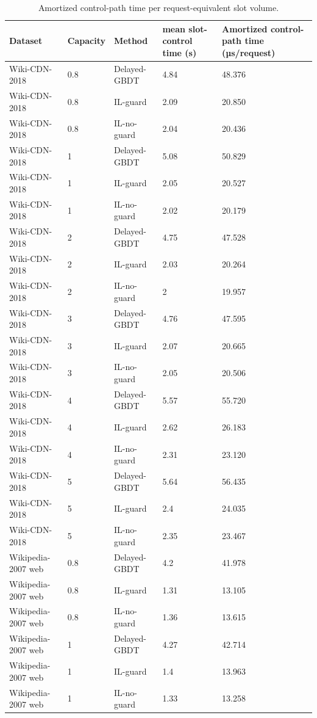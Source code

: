 \begin{table}[t]
\centering
\footnotesize
\caption{Amortized control-path time per request-equivalent slot volume.}
\label{tab:amortized_control_path}
\begin{tabular}{lllll}
\toprule
Dataset & Capacity & Method & mean slot-control time (s) & Amortized control-path time (µs/request) \\
\midrule
Wiki-CDN-2018 & 0.8 & Delayed-GBDT & 4.84 & 48.376 \\
Wiki-CDN-2018 & 0.8 & IL-guard & 2.09 & 20.850 \\
Wiki-CDN-2018 & 0.8 & IL-no-guard & 2.04 & 20.436 \\
Wiki-CDN-2018 & 1 & Delayed-GBDT & 5.08 & 50.829 \\
Wiki-CDN-2018 & 1 & IL-guard & 2.05 & 20.527 \\
Wiki-CDN-2018 & 1 & IL-no-guard & 2.02 & 20.179 \\
Wiki-CDN-2018 & 2 & Delayed-GBDT & 4.75 & 47.528 \\
Wiki-CDN-2018 & 2 & IL-guard & 2.03 & 20.264 \\
Wiki-CDN-2018 & 2 & IL-no-guard & 2 & 19.957 \\
Wiki-CDN-2018 & 3 & Delayed-GBDT & 4.76 & 47.595 \\
Wiki-CDN-2018 & 3 & IL-guard & 2.07 & 20.665 \\
Wiki-CDN-2018 & 3 & IL-no-guard & 2.05 & 20.506 \\
Wiki-CDN-2018 & 4 & Delayed-GBDT & 5.57 & 55.720 \\
Wiki-CDN-2018 & 4 & IL-guard & 2.62 & 26.183 \\
Wiki-CDN-2018 & 4 & IL-no-guard & 2.31 & 23.120 \\
Wiki-CDN-2018 & 5 & Delayed-GBDT & 5.64 & 56.435 \\
Wiki-CDN-2018 & 5 & IL-guard & 2.4 & 24.035 \\
Wiki-CDN-2018 & 5 & IL-no-guard & 2.35 & 23.467 \\
Wikipedia-2007 web & 0.8 & Delayed-GBDT & 4.2 & 41.978 \\
Wikipedia-2007 web & 0.8 & IL-guard & 1.31 & 13.105 \\
Wikipedia-2007 web & 0.8 & IL-no-guard & 1.36 & 13.615 \\
Wikipedia-2007 web & 1 & Delayed-GBDT & 4.27 & 42.714 \\
Wikipedia-2007 web & 1 & IL-guard & 1.4 & 13.963 \\
Wikipedia-2007 web & 1 & IL-no-guard & 1.33 & 13.258 \\

\end{tabular}
\end{table}
